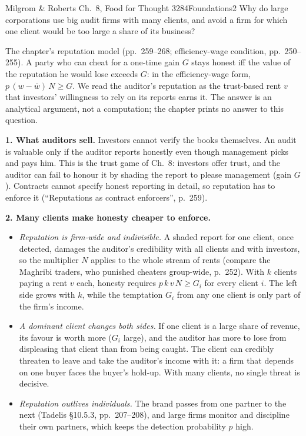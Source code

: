 \begin{exsol}{Milgrom \& Roberts Ch.~8, Food for Thought 3}{284}{Foundations}{2}
\asked Why do large corporations use big audit firms with many clients, and avoid a firm for which one
client would be too large a share of its business?

\method The chapter's reputation model (pp.~259--268; efficiency-wage condition, pp.~250--255).
A party who can cheat for a one-time gain $G$ stays honest iff the value of the reputation he would lose
exceeds $G$: in the efficiency-wage form, $p\,(w - \bar w)\,N \ge G$. We read the auditor's reputation as the
trust-based rent $v$ that investors' willingness to rely on its reports earns it. The answer is an
analytical argument, not a computation; the chapter prints no answer to this question.

\solution
\textbf{1. What auditors sell.} Investors cannot verify the books themselves. An audit is valuable only
if the auditor reports honestly even though management picks and pays him. This is the trust game of
Ch.~8: investors offer trust, and the auditor can fail to honour it by shading the report to please
management (gain $G$). Contracts cannot specify honest reporting in detail, so reputation has to enforce it
(``Reputations as contract enforcers'', p.~259).

\textbf{2. Many clients make honesty cheaper to enforce.}
\begin{itemize}
  \item \emph{Reputation is firm-wide and indivisible.} A shaded report for one client, once detected, damages
  the auditor's credibility with all clients and with investors, so the multiplier $N$ applies to the whole
  stream of rents (compare the Maghribi traders, who punished cheaters group-wide, p.~252). With $k$ clients
  paying a rent $v$ each, honesty requires $p\,k\,v\,N \ge G_i$ for every client $i$. The left side grows
  with $k$, while the temptation $G_i$ from any one client is only part of the firm's income.
  \item \emph{A dominant client changes both sides.} If one client is a large share of revenue, its
  favour is worth more ($G_i$ large), and the auditor has more to lose from displeasing that client
  than from being caught. The client can credibly threaten to leave and take the auditor's income with it:
  a firm that depends on one buyer faces the buyer's hold-up. With many clients, no single threat is
  decisive.
  \item \emph{Reputation outlives individuals.} The brand passes from one partner to the next
  (Tadelis \S10.5.3, pp.~207--208), and large firms monitor and discipline their own partners, which keeps
  the detection probability $p$ high.
\end{itemize}


\end{exsol}
